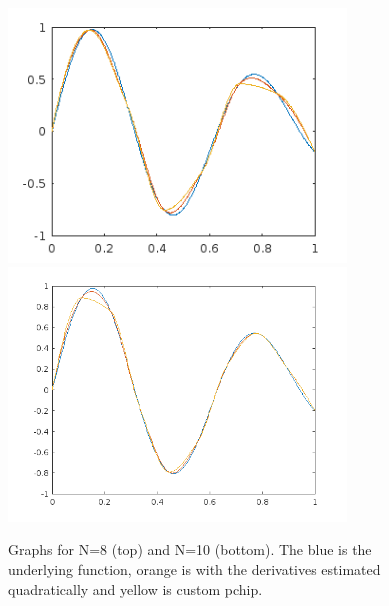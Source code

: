 \documentclass[letterpaper, reqno,11pt]{article}
\begin{document}
\begin{figure}[htpb]
    \centering
    \includegraphics[width=0.8\textwidth]{q4e-8}
    \includegraphics[width=0.8\textwidth]{q4e-10}
    \caption{Graphs for N=8 (top) and N=10 (bottom). The blue is the underlying function, orange is with the derivatives estimated quadratically and yellow is custom pchip.}
    \label{fig:4e}
\end{figure}
\end{document}
